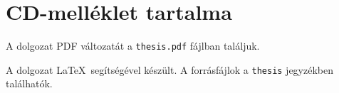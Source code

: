 \newpage
\section*{CD-melléklet tartalma}

A dolgozat PDF változatát a \texttt{thesis.pdf} fájlban találjuk.

A dolgozat \LaTeX\ segítségével készült. A forrásfájlok a \texttt{thesis} jegyzékben találhatók.


